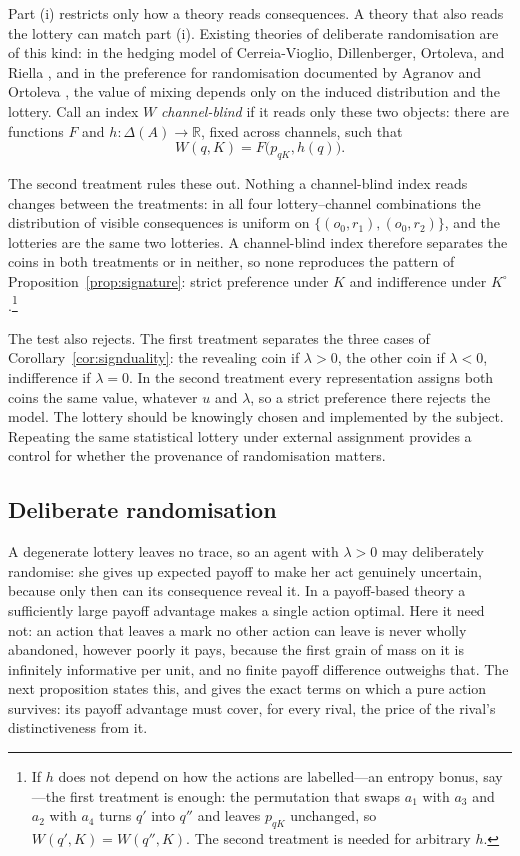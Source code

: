 \documentclass[11pt,a4paper]{article}
\theoremstyle{definition}
\newcommand{\D}{\Delta}
\newcommand{\Rnum}{\mathbb R}
\newcommand{\1}{\mathbf 1}
\begin{document}
Part \textup{(i)} restricts only how a theory reads consequences.  A theory that also reads the lottery can
match part \textup{(i)}.  Existing theories of deliberate randomisation are of this kind: in the hedging model
of Cerreia-Vioglio, Dillenberger, Ortoleva, and Riella \cite{CerreiaVioglioDillenbergerOrtolevaRiella2019}, and
in the preference for randomisation documented by Agranov and Ortoleva \cite{AgranovOrtoleva2017}, the value of
mixing depends only on the induced distribution and the lottery.  Call an index $W$ \emph{channel-blind} if it
reads only these two objects: there are functions $F$ and $h:\D(A)\to\Rnum$, fixed across channels, such that
\[
 W(q,K)=F\bigl(p_{qK},h(q)\bigr).
\]

The second treatment rules these out.  Nothing a channel-blind index reads changes between the treatments: in
all four lottery--channel combinations the distribution of visible consequences is uniform on
$\{(o_0,r_1),(o_0,r_2)\}$, and the lotteries are the same two lotteries.  A channel-blind index therefore
separates the coins in both treatments or in neither, so none reproduces the pattern of
Proposition~\ref{prop:signature}: strict preference under $K$ and indifference under
$K^\circ$.\footnote{If $h$ does not depend on how the actions are labelled---an entropy bonus, say---the first
treatment is enough: the permutation that swaps $a_1$ with $a_3$ and $a_2$ with $a_4$ turns $q'$ into $q''$ and
leaves $p_{qK}$ unchanged, so $W(q',K)=W(q'',K)$.  The second treatment is needed for arbitrary $h$.}

The test also rejects.  The first treatment separates the three cases of Corollary~\ref{cor:signduality}: the
revealing coin if $\lambda>0$, the other coin if $\lambda<0$, indifference if $\lambda=0$.  In the second
treatment every representation assigns both coins the same value, whatever $u$ and $\lambda$, so a strict
preference there rejects the model.  The lottery should be knowingly chosen and implemented by the subject.
Repeating the same statistical lottery under external assignment provides a control for whether the provenance
of randomisation matters.

\subsection{Deliberate randomisation}\label{sec:randomisation}

A degenerate lottery leaves no trace, so an agent with $\lambda>0$ may deliberately randomise: she gives up
expected payoff to make her act genuinely uncertain, because only then can its consequence reveal it.  In a
payoff-based theory a sufficiently large payoff advantage makes a single action optimal.  Here it need not: an
action that leaves a mark no other action can leave is never wholly abandoned, however poorly it pays, because
the first grain of mass on it is infinitely informative per unit, and no finite payoff difference outweighs
that.  The next proposition states this, and gives the exact terms on which a pure action survives: its payoff
advantage must cover, for every rival, the price of the rival's distinctiveness from it.
\end{document}
